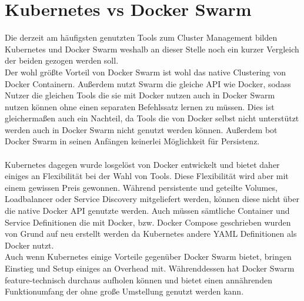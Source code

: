 \section{Kubernetes vs Docker Swarm}
Die derzeit am häufigsten genutzten Tools zum Cluster Management bilden Kubernetes und Docker Swarm weshalb an dieser Stelle noch ein kurzer Vergleich der beiden gezogen werden soll.\\
Der wohl größte Vorteil von Docker Swarm ist wohl das native Clustering von Docker Containern. Außerdem nutzt Swarm die gleiche API wie Docker, sodass Nutzer die gleichen Tools die sie mit Docker nutzen auch in Docker Swarm nutzen können ohne einen separaten Befehlssatz lernen zu müssen. Dies ist gleichermaßen auch ein Nachteil, da Tools die von Docker selbst nicht unterstützt werden auch in Docker Swarm nicht genutzt werden können. Außerdem bot Docker Swarm in seinen Anfängen keinerlei Möglichkeit für Persistenz.\\\\
Kubernetes dagegen wurde losgelöst von Docker entwickelt und bietet daher einiges an Flexibilität bei der Wahl von Tools. Diese Flexibilität wird aber mit einem gewissen Preis gewonnen. Während persistente und geteilte Volumes, Loadbalancer oder Service Discovery mitgeliefert werden, können diese nicht über die native Docker API genutzte werden. Auch müssen sämtliche Container und Service Definitionen die mit Docker, bzw. Docker Compose geschrieben wurden von Grund auf neu erstellt werden da Kubernetes andere YAML Definitionen als Docker nutzt.\\
Auch wenn Kubernetes einige Vorteile gegenüber Docker Swarm bietet, bringen Einstieg und Setup einiges an Overhead mit. Währenddessen hat Docker Swarm feature-technisch durchaus aufholen können und bietet einen annährenden Funktionumfang der ohne große Umstellung genutzt werden kann.
